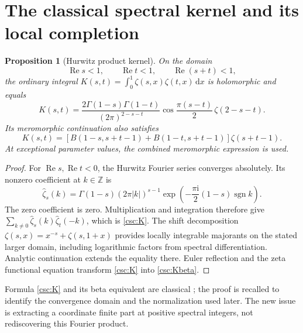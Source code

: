\documentclass[11pt,a4paper]{article}
\numberwithin{equation}{section}
\newtheorem{proposition}[theorem]{Proposition}
\theoremstyle{definition}
\newcommand{\dd}{\,\mathrm dx}
\newcommand{\ii}{\mathrm i}
\newcommand{\Rea}{\operatorname{Re}}
\newcommand{\Z}{\mathbb Z}
\begin{document}
\section{The classical spectral kernel and its local completion}\label{csc:kernel}
\begin{proposition}[Hurwitz product kernel]\label{csc:classical}
On the domain
\[
\Rea s<1,\qquad \Rea t<1,\qquad \Rea(s+t)<1,
\]
the ordinary integral $K(s,t)=\int_0^1\zeta(s,x)\zeta(t,x)\dd$ is holomorphic and equals
\begin{equation}\label{csc:K}
K(s,t)=\frac{2\Gamma(1-s)\Gamma(1-t)}{(2\pi)^{2-s-t}}
\cos\frac{\pi(s-t)}2\,\zeta(2-s-t).
\end{equation}
Its meromorphic continuation also satisfies
\begin{equation}\label{csc:Kbeta}
K(s,t)=\left[B(1-s,s+t-1)+B(1-t,s+t-1)\right]\zeta(s+t-1).
\end{equation}
At exceptional parameter values, the combined meromorphic expression is used.
\end{proposition}
\begin{proof}
For $\Rea s,\Rea t<0$, the Hurwitz Fourier series converges absolutely. Its nonzero coefficient at $k\in\Z$ is
\[
\widehat\zeta_s(k)=\Gamma(1-s)(2\pi|k|)^{s-1}
\exp\left(-\frac{\pi\ii}2(1-s)\operatorname{sgn}k\right).
\]
The zero coefficient is zero. Multiplication and integration therefore give
$\sum_{k\ne0}\widehat\zeta_s(k)\widehat\zeta_t(-k)$, which is \eqref{csc:K}. The shift decomposition $\zeta(s,x)=x^{-s}+\zeta(s,1+x)$ provides locally integrable majorants on the stated larger domain, including logarithmic factors from spectral differentiation. Analytic continuation extends the equality there. Euler reflection and the zeta functional equation transform \eqref{csc:K} into \eqref{csc:Kbeta}.
\end{proof}
Formula \eqref{csc:K} and its beta equivalent are classical \cite{csc:EM}; the proof is recalled to identify the convergence domain and the normalization used later. The new issue is extracting a coordinate finite part at positive spectral integers, not rediscovering this Fourier product.
\end{document}
